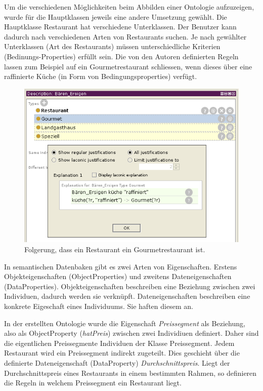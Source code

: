 Um die verschiedenen Möglichkeiten beim Abbilden einer Ontologie aufzuzeigen, wurde für die Hauptklassen jeweils eine andere Umsetzung gewählt. Die Hauptklasse Restaurant hat verschiedene Unterklassen. Der Benutzer kann dadurch nach verschiedenen Arten von Restaurants suchen. Je nach gewählter Unterklassen (Art des Restaurants) müssen unterschiedliche Kriterien (Bedinungs-Properties) erfüllt sein. Die von den Autoren definierten Regeln lassen zum Beispiel auf ein Gourmetrestaurant schliessen, wenn dieses über eine raffinierte Küche (in Form von Bedingungsproperties) verfügt.

\begin{figure}[H]%
    \centering
    \includegraphics[scale=0.7]{bilder/loesung_regeln.png}
    \caption{Folgerung, dass ein Restaurant ein Gourmetrestaurant ist.\label{fig:loesung:regeln}\protect\footnotemark}
\end{figure}

In semantischen Datenbaken gibt es zwei Arten von Eigenschaften. Erstens Objekteigenschaften (ObjectProperties) und zweitens Dateneigenschaften (DataProperties). Objekteigenschaften beschreiben eine Beziehung zwischen zwei Individuen, dadurch werden sie verknüpft. Dateneigenschaften beschreiben eine konkrete Eigeschaft eines Individuums. Sie haften diesem an.

In der erstellten Ontologie wurde die Eigenschaft \textit{Preissegment} als Beziehung, also als ObjectProperty (\textit{hatPreis}) zwischen zwei Individiuen definiert. Daher sind die eigentlichen Preissegmente Individuen der Klasse Preissegment. Jedem Restaurant wird ein Preissegment indirekt zugeteilt. Dies geschieht über die definierte Dateneigenschaft (DataProperty) \textit{Durchschnittspreis}. Liegt der Durchschnittspreis eines Restaurants in einem bestimmten Rahmen, so definieren die Regeln in welchem Preissegment ein Restaurant liegt.

